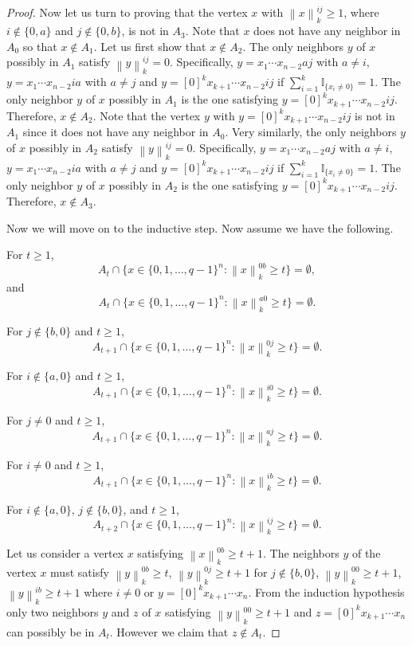 \documentclass[reqno,11pt]{amsart}
\renewcommand{\geq}{\geqslant}
\begin{document}
\begin{proof}
Now let us turn to proving that the vertex $x$ with $\left \lVert x \right \rVert_k^{ij} \geq 1$, where $i \notin \{0,a\}$ and $j \notin \{0,b\}$, is not in $A_3$. Note that $x$ does not have any neighbor in $A_0$ so that $x \notin A_1$. Let us first show that $x \notin A_2$. The only neighbors $y$ of $x$ possibly in $A_1$ satisfy $\left \lVert y \right \rVert_k^{ij}=0$. Specifically, $y=x_1\cdots x_{n-2}aj$ with $a \neq i$, $y=x_1\cdots x_{n-2}ia$ with $a \neq j$ and $y=[0]^kx_{k+1}\cdots x_{n-2}ij$ if $\sum_{i=1}^k\mathbb{I}_{\{x_i \neq 0\}}=1$. The only neighbor $y$ of $x$ possibly in $A_1$ is the one satisfying $y=[0]^kx_{k+1}\cdots x_{n-2}ij$. Therefore, $x \notin A_2$. Note that the vertex $y$ with $y=[0]^kx_{k+1}\cdots x_{n-2}ij$ is not in $A_1$ since it does not have any neighbor in $A_0$. Very similarly, the only neighbors $y$ of $x$ possibly in $A_2$ satisfy $\left \lVert y \right \rVert_k^{ij}=0$. Specifically, $y=x_1\cdots x_{n-2}aj$ with $a \neq i$, $y=x_1\cdots x_{n-2}ia$ with $a \neq j$ and $y=[0]^kx_{k+1}\cdots x_{n-2}ij$ if $\sum_{i=1}^k\mathbb{I}_{\{x_i \neq 0 \}}=1$. The only neighbor $y$ of $x$ possibly in $A_2$ is the one satisfying $y=[0]^kx_{k+1}\cdots x_{n-2}ij$. Therefore, $x \notin A_3$.

Now we will move on to the inductive step. Now assume we have the following. 

For $t \geq 1$,
$$A_t \cap \{x \in \{0,1,\dots,q-1\}^n: \left \lVert x \right \rVert_k^{0b} \geq t\}=\emptyset,$$ 
and 
$$A_t \cap \{x \in \{0,1,\dots,q-1\}^n: \left \lVert x \right \rVert_k^{a0} \geq t\}=\emptyset.$$ 

For $j \notin \{b,0\}$ and $t \geq 1$,
$$A_{t+1} \cap \{x \in \{0,1,\dots,q-1\}^n: \left \lVert x \right \rVert_k^{0j} \geq t\}=\emptyset.$$

For $i \notin \{a,0\}$ and $t \geq 1$,
$$A_{t+1} \cap \{x \in \{0,1,\dots,q-1\}^n: \left \lVert x \right \rVert_k^{i0} \geq t\}=\emptyset.$$

For $j \neq 0$ and $t \geq 1$,
$$A_{t+1} \cap \{x \in \{0,1,\dots,q-1\}^n: \left \lVert x \right \rVert_k^{aj} \geq t\}=\emptyset.$$

For $i \neq 0$ and $t \geq 1$,
$$A_{t+1} \cap \{x \in \{0,1,\dots,q-1\}^n: \left \lVert x \right \rVert_k^{ib} \geq t\}=\emptyset.$$

For $i \notin \{a,0\}$, $j \notin \{b,0\}$, and $t\geq 1$,
$$A_{t+2} \cap \{x \in \{0,1,\dots,q-1\}^n: \left \lVert x \right \rVert_k^{ij} \geq t\}=\emptyset.$$

Let us consider a vertex $x$ satisfying $\left \lVert x \right \rVert_k^{0b} \geq t+1$. The neighbors $y$ of the vertex $x$ must satisfy 
$\left \lVert y \right \rVert_k^{0b} \geq t$, $\left \lVert y \right \rVert_k^{0j} \geq t+1$ for  $j \notin \{b,0\}$, $\left \lVert y \right \rVert_k^{00} \geq t+1$, $\left \lVert y \right \rVert_k^{ib} \geq t+1$ where $i \neq 0$ or $y=[0]^kx_{k+1}\cdots x_{n}$. From the induction hypothesis only two neighbors $y$ and $z$ of $x$ satisfying $\left \lVert y \right \rVert_k^{00} \geq t+1$ and $z=[0]^kx_{k+1}\cdots x_{n}$ can possibly be in $A_t$. However we claim that $z \notin A_t$.


\end{proof}
\end{document}

